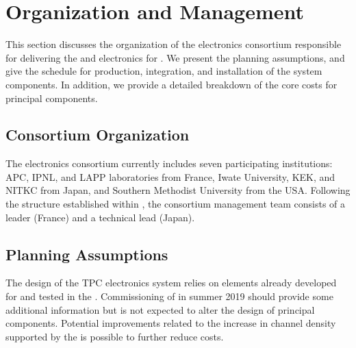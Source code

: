 \section{Organization and Management}
\label{sec:dp-tpcelec-org}
This section discusses the organization of the   electronics consortium responsible for delivering the  and  electronics for . We present the planning assumptions, and give the schedule for production, integration, and installation of the system components. In addition, we provide a detailed breakdown of the core costs for principal components. %


\subsection{Consortium Organization}
\label{ssec:dp-tpcelec-org-consortium}
The \dual {} electronics consortium currently includes 
seven participating institutions: APC, IPNL, and LAPP laboratories from France, Iwate University, KEK, and NITKC from Japan, and Southern Methodist University from the  USA. Following the structure established within , the consortium management team consists of a leader (France) and a technical lead (Japan). 


\subsection{Planning Assumptions}
\label{ssec:dp-tpcelec-org-assmp}
The design of the \dual TPC electronics system relies on elements already developed for  and tested in the .  Commissioning of  in summer 2019 should provide some additional information but %
is not expected to alter the design of principal components. Potential improvements related to the increase in channel density supported by the   is possible to further reduce costs. 


